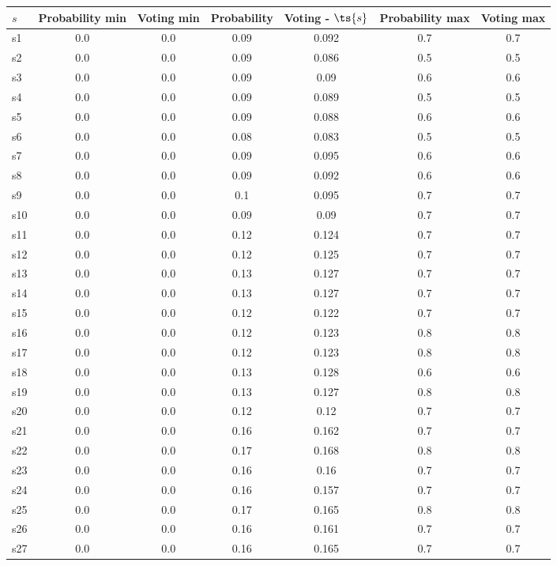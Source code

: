 \documentclass{article}
\begin{document}
\noindent\begin{tabular}{|l|c|c|c|c|c|c|}
\hline
$s$& Probability min & Voting min & Probability & Voting - $\ts{s}$ & Probability max & Voting max\\
\hline
s1 &0.0 & 0.0 & 0.09 & 0.092 & 0.7 & 0.7\\
\hline
s2 &0.0 & 0.0 & 0.09 & 0.086 & 0.5 & 0.5\\
\hline
s3 &0.0 & 0.0 & 0.09 & 0.09 & 0.6 & 0.6\\
\hline
s4 &0.0 & 0.0 & 0.09 & 0.089 & 0.5 & 0.5\\
\hline
s5 &0.0 & 0.0 & 0.09 & 0.088 & 0.6 & 0.6\\
\hline
s6 &0.0 & 0.0 & 0.08 & 0.083 & 0.5 & 0.5\\
\hline
s7 &0.0 & 0.0 & 0.09 & 0.095 & 0.6 & 0.6\\
\hline
s8 &0.0 & 0.0 & 0.09 & 0.092 & 0.6 & 0.6\\
\hline
s9 &0.0 & 0.0 & 0.1 & 0.095 & 0.7 & 0.7\\
\hline
s10 &0.0 & 0.0 & 0.09 & 0.09 & 0.7 & 0.7\\
\hline
s11 &0.0 & 0.0 & 0.12 & 0.124 & 0.7 & 0.7\\
\hline
s12 &0.0 & 0.0 & 0.12 & 0.125 & 0.7 & 0.7\\
\hline
s13 &0.0 & 0.0 & 0.13 & 0.127 & 0.7 & 0.7\\
\hline
s14 &0.0 & 0.0 & 0.13 & 0.127 & 0.7 & 0.7\\
\hline
s15 &0.0 & 0.0 & 0.12 & 0.122 & 0.7 & 0.7\\
\hline
s16 &0.0 & 0.0 & 0.12 & 0.123 & 0.8 & 0.8\\
\hline
s17 &0.0 & 0.0 & 0.12 & 0.123 & 0.8 & 0.8\\
\hline
s18 &0.0 & 0.0 & 0.13 & 0.128 & 0.6 & 0.6\\
\hline
s19 &0.0 & 0.0 & 0.13 & 0.127 & 0.8 & 0.8\\
\hline
s20 &0.0 & 0.0 & 0.12 & 0.12 & 0.7 & 0.7\\
\hline
s21 &0.0 & 0.0 & 0.16 & 0.162 & 0.7 & 0.7\\
\hline
s22 &0.0 & 0.0 & 0.17 & 0.168 & 0.8 & 0.8\\
\hline
s23 &0.0 & 0.0 & 0.16 & 0.16 & 0.7 & 0.7\\
\hline
s24 &0.0 & 0.0 & 0.16 & 0.157 & 0.7 & 0.7\\
\hline
s25 &0.0 & 0.0 & 0.17 & 0.165 & 0.8 & 0.8\\
\hline
s26 &0.0 & 0.0 & 0.16 & 0.161 & 0.7 & 0.7\\
\hline
s27 &0.0 & 0.0 & 0.16 & 0.165 & 0.7 & 0.7\\

\end{tabular}
\end{document}
